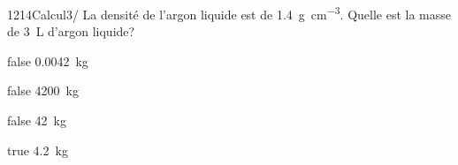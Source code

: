             \begin{question}{1214}{Calcul}{3}{/}
                La densité de l'argon liquide est de \SI{1.4}{\gram\per\centi\meter\cubed}. Quelle est la masse de \SI{3}{\liter} d'argon liquide?
            \end{question}
            \begin{reponses}
                \item[false] \SI{0.0042}{\kilo\gram}
                \item[false] \SI{4200}{\kilo\gram}
                \item[false] \SI{42}{\kilo\gram}
                \item[true] \SI{4.2}{\kilo\gram}
            \end{reponses}
